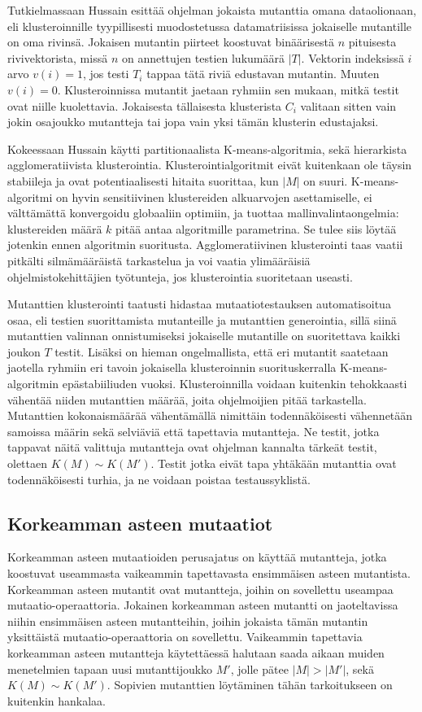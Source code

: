 \documentclass[finnish]{tktltiki2}
\begin{document}
Tutkielmassaan Hussain esittää ohjelman jokaista mutanttia omana dataolionaan, eli klusteroinnille tyypillisesti muodostetussa datamatriisissa jokaiselle mutantille on oma rivinsä. Jokaisen mutantin piirteet koostuvat binäärisestä $n$ pituisesta rivivektorista, missä $n$ on annettujen testien lukumäärä $|T|$. Vektorin indeksissä $i$ arvo $v(i) = 1$, jos testi $T_i$ tappaa tätä riviä edustavan mutantin. Muuten $v(i) = 0$. Klusteroinnissa mutantit jaetaan ryhmiin sen mukaan, mitkä testit ovat niille kuolettavia. Jokaisesta tällaisesta klusterista $C_{i}$ valitaan sitten vain jokin osajoukko mutantteja tai jopa vain yksi tämän klusterin edustajaksi. 

Kokeessaan Hussain käytti partitionaalista K-means-algoritmia, sekä hierarkista agglomeratiivista klusterointia. Klusterointialgoritmit eivät kuitenkaan ole täysin stabiileja ja ovat potentiaalisesti hitaita suorittaa, kun $|M|$ on suuri. K-means-algoritmi on hyvin sensitiivinen klustereiden alkuarvojen asettamiselle, ei välttämättä konvergoidu globaaliin optimiin, ja tuottaa mallinvalintaongelmia: klustereiden määrä $k$ pitää antaa algoritmille parametrina. Se tulee siis löytää jotenkin ennen algoritmin suoritusta. Agglomeratiivinen klusterointi taas vaatii pitkälti silmämääräistä tarkastelua ja voi vaatia ylimääräisiä ohjelmistokehittäjien työtunteja, jos klusterointia suoritetaan useasti. 

Mutanttien klusterointi taatusti hidastaa mutaatiotestauksen automatisoitua osaa, eli testien suorittamista mutanteille ja mutanttien generointia, sillä siinä mutanttien valinnan onnistumiseksi jokaiselle mutantille on suoritettava kaikki joukon $T$ testit. Lisäksi on hieman ongelmallista, että eri mutantit saatetaan jaotella ryhmiin eri tavoin jokaisella klusteroinnin suorituskerralla K-means-algoritmin epästabiiliuden vuoksi. Klusteroinnilla voidaan kuitenkin tehokkaasti vähentää niiden mutanttien määrää, joita ohjelmoijien pitää tarkastella. Mutanttien kokonaismäärää vähentämällä nimittäin todennäköisesti vähennetään samoissa määrin sekä selviäviä että tapettavia mutantteja. Ne testit, jotka tappavat näitä valittuja mutantteja ovat ohjelman kannalta tärkeät testit, olettaen $K(M) \sim K(M')$. Testit jotka eivät tapa yhtäkään mutanttia ovat todennäköisesti turhia, ja ne voidaan poistaa testaussyklistä.

\subsection{Korkeamman asteen mutaatiot}
Korkeamman asteen mutaatioiden perusajatus on käyttää mutantteja, jotka koostuvat useammasta vaikeammin tapettavasta ensimmäisen asteen mutantista. Korkeamman asteen mutantit ovat mutantteja, joihin on sovellettu useampaa mu\-taa\-tio\--ope\-raatto\-ria. Jokainen korkeamman asteen mutantti on jaoteltavissa niihin ensimmäisen asteen mutantteihin, joihin jokaista tämän mutantin yksittäistä mu\-taa\-tio\--ope\-raatto\-ria on sovellettu. Vaikeammin tapettavia korkeamman asteen mutantteja käytettäessä halutaan saada aikaan muiden menetelmien tapaan uusi mutanttijoukko $M'$, jolle pätee $|M| > |M'|$, sekä $K(M) \sim K(M')$. Sopivien mutanttien löytäminen tähän tarkoitukseen on kuitenkin hankalaa. 
\end{document}
